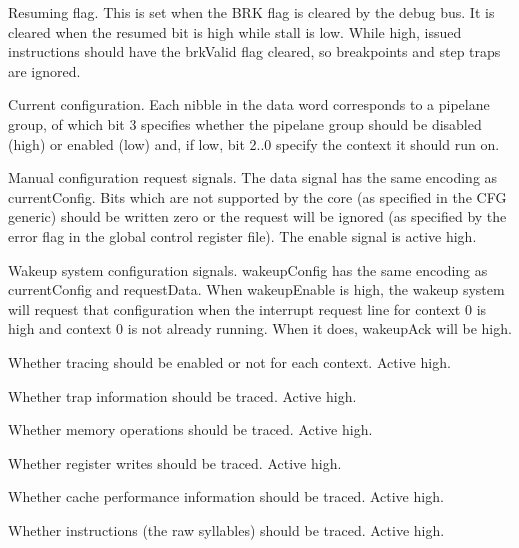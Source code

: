 \ifaceSubGroup{}
Resuming flag. This is set when the BRK flag is cleared by the debug bus. It is 
cleared when the resumed bit is high while stall is low. While high, issued 
instructions should have the brkValid flag cleared, so breakpoints and step 
traps are ignored.
    
\ifaceSubGroup{}
Current configuration. Each nibble in the data word corresponds to a pipelane 
group, of which bit 3 specifies whether the pipelane group should be disabled 
(high) or enabled (low) and, if low, bit 2..0 specify the context it should run 
on.

\ifaceSubGroup{}
Manual configuration request signals. The data signal has the same encoding as 
currentConfig. Bits which are not supported by the core (as specified in the CFG 
generic) should be written zero or the request will be ignored (as specified by 
the error flag in the global control register file). The enable signal is active 
high.

\ifaceSubGroup{}
Wakeup system configuration signals. wakeupConfig has the same encoding as
currentConfig and requestData. When wakeupEnable is high, the wakeup system will
request that configuration when the interrupt request line for context 0 is high
and context 0 is not already running. When it does, wakeupAck will be high.

\ifaceSubGroup{}
Whether tracing should be enabled or not for each context. Active high.
    
\ifaceSubGroup{}
Whether trap information should be traced. Active high.
    
\ifaceSubGroup{}
Whether memory operations should be traced. Active high.
    
\ifaceSubGroup{}
Whether register writes should be traced. Active high.
    
\ifaceSubGroup{}
Whether cache performance information should be traced. Active high.
    
\ifaceSubGroup{}
Whether instructions (the raw syllables) should be traced. Active high.
